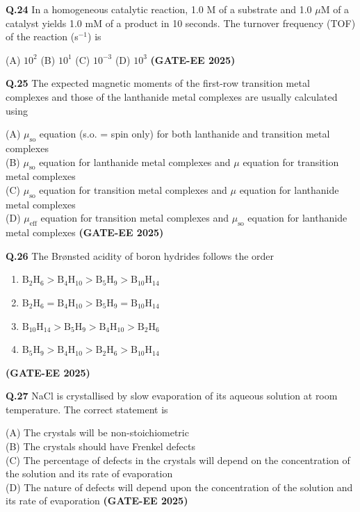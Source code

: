 \documentclass[12pt]{article}
\begin{document}
\begin{enumerate}
\vspace{0.5cm}

\textbf{Q.24} In a homogeneous catalytic reaction, 1.0 M of a substrate and 1.0 $\mu$M of a catalyst yields 1.0 mM of a product in 10 seconds. The turnover frequency (TOF) of the reaction (s$^{-1}$) is

(A) $10^2$ \hspace{1cm}
(B) $10^1$ \hspace{1cm}
(C) $10^{-3}$ \hspace{1cm}
(D) $10^3$   \textbf{(GATE-EE 2025)}


\textbf{Q.25} The expected magnetic moments of the first-row transition metal complexes and those of the lanthanide metal complexes are usually calculated using

(A) $\mu_{\text{so}}$ equation (s.o. = spin only) for both lanthanide and transition metal complexes\\
(B) $\mu_{\text{so}}$ equation for lanthanide metal complexes and $\mu$ equation for transition metal complexes\\
(C) $\mu_{\text{so}}$ equation for transition metal complexes and $\mu$ equation for lanthanide metal complexes\\
(D) $\mu_{\text{eff}}$ equation for transition metal complexes and $\mu_{\text{so}}$ equation for lanthanide metal complexes   \textbf{(GATE-EE 2025)}


\vspace{0.5cm}

\textbf{Q.26} \quad The Brønsted acidity of boron hydrides follows the order

\begin{enumerate}
    \item[(A)] $\mathrm{B_2H_6 > B_4H_{10} > B_5H_9 > B_{10}H_{14}}$
    \item[(B)] $\mathrm{B_2H_6 = B_4H_{10} > B_5H_9 = B_{10}H_{14}}$
    \item[(C)] $\mathrm{B_{10}H_{14} > B_5H_9 > B_4H_{10} > B_2H_6}$
    \item[(D)] $\mathrm{B_5H_9 > B_4H_{10} > B_2H_6 > B_{10}H_{14}}$
\end{enumerate} \textbf{(GATE-EE 2025)}

\vspace{0.5cm}

\textbf{Q.27} NaCl is crystallised by slow evaporation of its aqueous solution at room temperature. The correct statement is

(A) The crystals will be non-stoichiometric\\
(B) The crystals should have Frenkel defects\\
(C) The percentage of defects in the crystals will depend on the concentration of the solution and its rate of evaporation\\
(D) The nature of defects will depend upon the concentration of the solution and its rate of evaporation   \textbf{(GATE-EE 2025)}



\end{enumerate}
\end{document}
